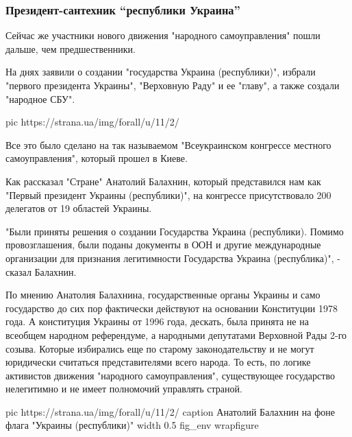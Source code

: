  
 
 
 
 

\subsubsection{Президент-сантехник \enquote{республики Украина}}

Сейчас же участники нового движения "народного самоуправления" пошли
дальше, чем предшественники.

На днях заявили о создании "государства Украина (республики)", избрали
"первого президента Украины", "Верховную Раду" и ее "главу", а также
создали "народное СБУ".

\ifcmt
pic https://strana.ua/img/forall/u/11/2/%
\fi

Все это было сделано на так называемом "Всеукраинском конгрессе местного
самоуправления", который прошел в Киеве.

Как рассказал "Стране" Анатолий Балахнин, который представился нам как
"Первый президент Украины (республики)", на конгрессе присутствовало 200
делегатов от 19 областей Украины.

"Были приняты решения о создании Государства Украина (республики). Помимо
провозглашения, были поданы документы в ООН и другие международные
организации для признания легитимности Государства Украина (республика)",
- сказал Балахнин.

По мнению Анатолия Балахнина, государственные органы Украины и само
государство до сих пор фактически действуют на основании Конституции 1978
года. А конституция Украины от 1996 года, дескать, была принята не на
всеобщем народном референдуме, а народными депутатами Верховной Рады 2-го
созыва. Которые избирались еще по старому законодательству и не могут
юридически считаться представителями всего народа. То есть, по логике
активистов движения "народного самоуправления", существующее государство
нелегитимно и не имеет полномочий управлять страной.

\ifcmt
  pic https://strana.ua/img/forall/u/11/2/%
  caption Анатолий Балахнин на фоне флага "Украины (республики)"
  width 0.5
  fig_env wrapfigure
\fi

